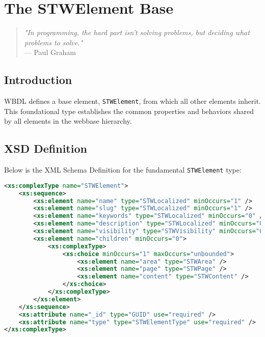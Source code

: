 \chapter{The STWElement Base}
\label{chap:stwlement}

\begin{quote}
\textit{"In programming, the hard part isn't solving problems, but deciding what problems to solve."} \\
— Paul Graham
\end{quote}

\section{Introduction}

WBDL defines a base element, \texttt{STWElement}, from which all other elements inherit. This foundational type establishes the common properties and behaviors shared by all elements in the webbase hierarchy.

\section{XSD Definition}

Below is the XML Schema Definition for the fundamental \texttt{STWElement} type:

\begin{lstlisting}[language=XML,caption={STWElement XSD Definition}]
<xs:complexType name="STWElement">
    <xs:sequence>
        <xs:element name="name" type="STWLocalized" minOccurs="1" />
        <xs:element name="slug" type="STWLocalized" minOccurs="1" />
        <xs:element name="keywords" type="STWLocalized" minOccurs="0" />
        <xs:element name="description" type="STWLocalized" minOccurs="0" />
        <xs:element name="visibility" type="STWVisibility" minOccurs="0" />
        <xs:element name="children" minOccurs="0">
            <xs:complexType>
                <xs:choice minOccurs="1" maxOccurs="unbounded">
                    <xs:element name="area" type="STWArea" />
                    <xs:element name="page" type="STWPage" />
                    <xs:element name="content" type="STWContent" />
                </xs:choice>
            </xs:complexType>
        </xs:element>
    </xs:sequence>
    <xs:attribute name="_id" type="GUID" use="required" />
    <xs:attribute name="type" type="STWElementType" use="required" />
</xs:complexType>
\end{lstlisting}

